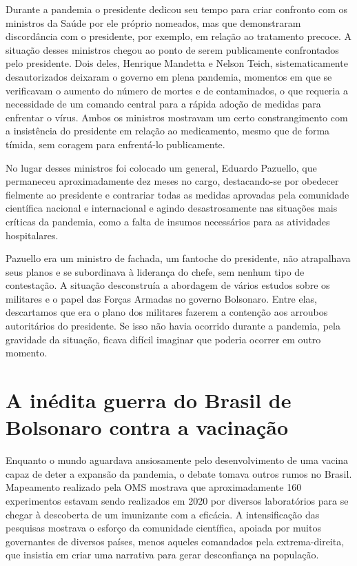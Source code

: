 Durante a pandemia o presidente dedicou seu tempo para criar confronto
com os ministros da Saúde por ele próprio nomeados, mas que demonstraram
discordância com o presidente, por exemplo, em relação ao tratamento
precoce. A situação desses ministros chegou ao ponto de serem
publicamente confrontados pelo presidente. Dois deles, Henrique Mandetta
e Nelson Teich, sistematicamente desautorizados deixaram o governo em
plena pandemia, momentos em que se verificavam o aumento do número de
mortes e de contaminados, o que requeria a necessidade de um comando
central para a rápida adoção de medidas para enfrentar o vírus. Ambos os
ministros mostravam um certo constrangimento com a insistência do
presidente em relação ao medicamento, mesmo que de forma tímida, sem
coragem para enfrentá-lo publicamente.

No lugar desses ministros foi colocado um general, Eduardo Pazuello, que
permaneceu aproximadamente dez meses no cargo, destacando-se por
obedecer fielmente ao presidente e contrariar todas as medidas aprovadas
pela comunidade científica nacional e internacional e agindo
desastrosamente nas situações mais críticas da pandemia, como a falta de
insumos necessários para as atividades hospitalares.

Pazuello era um ministro de fachada, um fantoche do presidente, não
atrapalhava seus planos e se subordinava à liderança do chefe, sem
nenhum tipo de contestação. A situação desconstruía a abordagem de
vários estudos sobre os militares e o papel das Forças Armadas no
governo Bolsonaro. Entre elas, descartamos que era o plano dos militares
fazerem a contenção aos arroubos autoritários do presidente. Se isso não
havia ocorrido durante a pandemia, pela gravidade da situação, ficava
difícil imaginar que poderia ocorrer em outro momento.

\section{A inédita guerra do Brasil de Bolsonaro contra a vacinação}

Enquanto o mundo aguardava ansiosamente pelo desenvolvimento de uma
vacina capaz de deter a expansão da pandemia, o debate tomava outros
rumos no Brasil. Mapeamento realizado pela OMS mostrava que
aproximadamente 160 experimentos estavam sendo realizados em 2020 por
diversos laboratórios para se chegar à descoberta de um imunizante com a
eficácia. A intensificação das pesquisas mostrava o esforço da
comunidade científica, apoiada por muitos governantes de diversos
países, menos aqueles comandados pela extrema-direita, que insistia em
criar uma narrativa para gerar desconfiança na população.


